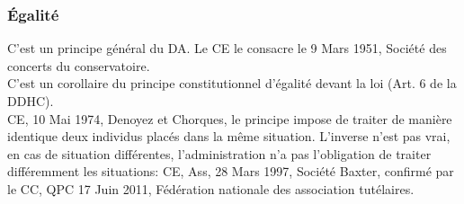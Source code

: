 \documentclass[10pt, a4paper, openany]{book}
\begin{document}
\subsubsection{Égalité}

C'est un principe général du DA. Le CE le consacre le 9 Mars 1951, Société des concerts du conservatoire. \\
C'est un corollaire du principe constitutionnel d'égalité devant la loi (Art. 6 de la DDHC). \\
CE, 10 Mai 1974, Denoyez et Chorques, le principe impose de traiter de manière identique deux individus placés dans la même situation. L'inverse n'est pas vrai, en cas de situation différentes, l'administration n'a pas l'obligation de traiter différemment les situations: CE, Ass, 28 Mars 1997, Société Baxter, confirmé par le CC, QPC 17 Juin 2011, Fédération nationale des association tutélaires. 
\end{document}
